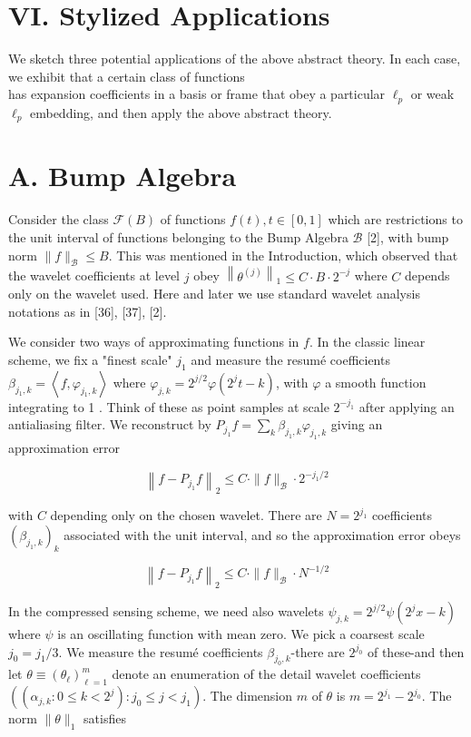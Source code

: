 \documentclass[10pt]{article}
\begin{document}
\section*{VI. Stylized Applications}
We sketch three potential applications of the above abstract theory. In each case, we exhibit that a certain class of functions\\
has expansion coefficients in a basis or frame that obey a particular $\ell_{p}$ or weak $\ell_{p}$ embedding, and then apply the above abstract theory.

\section*{A. Bump Algebra}
Consider the class $\mathcal{F}(B)$ of functions $f(t), t \in[0,1]$ which are restrictions to the unit interval of functions belonging to the Bump Algebra $\mathcal{B}$ [2], with bump norm $\|f\|_{\mathcal{B}} \leq B$. This was mentioned in the Introduction, which observed that the wavelet coefficients at level $j$ obey $\left\|\theta^{(j)}\right\|_{1} \leq C \cdot B \cdot 2^{-j}$ where $C$ depends only on the wavelet used. Here and later we use standard wavelet analysis notations as in [36], [37], [2].

We consider two ways of approximating functions in $f$. In the classic linear scheme, we fix a "finest scale" $j_{1}$ and measure the resumé coefficients $\beta_{j_{1}, k}=\left\langle f, \varphi_{j_{1}, k}\right\rangle$ where $\varphi_{j, k}= 2^{j / 2} \varphi\left(2^{j} t-k\right)$, with $\varphi$ a smooth function integrating to 1 . Think of these as point samples at scale $2^{-j_{1}}$ after applying an antialiasing filter. We reconstruct by $P_{j_{1}} f=\sum_{k} \beta_{j_{1}, k} \varphi_{j_{1}, k}$ giving an approximation error

$$
\left\|f-P_{j_{1}} f\right\|_{2} \leq C \cdot\|f\|_{\mathcal{B}} \cdot 2^{-j_{1} / 2}
$$

with $C$ depending only on the chosen wavelet. There are $N= 2^{j_{1}}$ coefficients $\left(\beta_{j_{1}, k}\right)_{k}$ associated with the unit interval, and so the approximation error obeys

$$
\left\|f-P_{j_{1}} f\right\|_{2} \leq C \cdot\|f\|_{\mathcal{B}} \cdot N^{-1 / 2}
$$

In the compressed sensing scheme, we need also wavelets $\psi_{j, k}=2^{j / 2} \psi\left(2^{j} x-k\right)$ where $\psi$ is an oscillating function with mean zero. We pick a coarsest scale $j_{0}=j_{1} / 3$. We measure the resumé coefficients $\beta_{j_{0}, k}$-there are $2^{j_{0}}$ of these-and then let $\theta \equiv\left(\theta_{\ell}\right)_{\ell=1}^{m}$ denote an enumeration of the detail wavelet coefficients $\left(\left(\alpha_{j, k}: 0 \leq k<2^{j}\right): j_{0} \leq j<j_{1}\right)$. The dimension $m$ of $\theta$ is $m=2^{j_{1}}-2^{j_{0}}$. The norm $\|\theta\|_{1}$ satisfies
\end{document}
